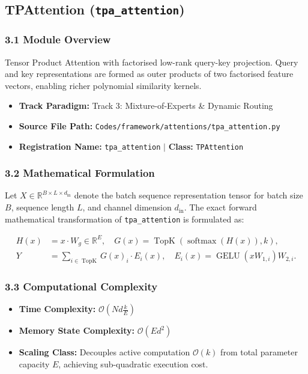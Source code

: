 \subsection{TPAttention (\texttt{tpa\_attention})}
\label{sec:app_module_tpa_attention}

\subsubsection*{3.1 Module Overview}
Tensor Product Attention with factorised low-rank query-key projection.  Query and key representations are formed as outer products of two factorised feature vectors, enabling richer polynomial similarity kernels.
\begin{itemize}
    \item \textbf{Track Paradigm:} Track 3: Mixture-of-Experts \& Dynamic Routing
    \item \textbf{Source File Path:} \texttt{Codes/framework/attentions/tpa\_attention.py}
    \item \textbf{Registration Name:} \texttt{tpa\_attention} $\mid$ \textbf{Class:} \texttt{TPAttention}
\end{itemize}

\subsubsection*{3.2 Mathematical Formulation}
Let $X \in \mathbb{R}^{B \times L \times d_{\text{in}}}$ denote the batch sequence representation tensor for batch size $B$, sequence length $L$, and channel dimension $d_{\text{in}}$. The exact forward mathematical transformation of \texttt{tpa\_attention} is formulated as:

\begin{align}
H(x) &= x \cdot W_g \in \mathbb{R}^{E}, \quad G(x) = \operatorname{TopK}\left(\operatorname{softmax}(H(x)), k\right), \\
Y &= \sum_{i \in \operatorname{TopK}} G(x)_i \cdot E_i(x), \quad E_i(x) = \operatorname{GELU}(x W_{1, i}) W_{2, i}.
\end{align}


\subsubsection*{3.3 Computational Complexity}
\begin{itemize}
    \item \textbf{Time Complexity:} $\mathcal{O}(N d \frac{k}{E})$
    \item \textbf{Memory State Complexity:} $\mathcal{O}(E d^2)$
    \item \textbf{Scaling Class:} Decouples active computation $\mathcal{O}(k)$ from total parameter capacity $E$, achieving sub-quadratic execution cost.
\end{itemize}

